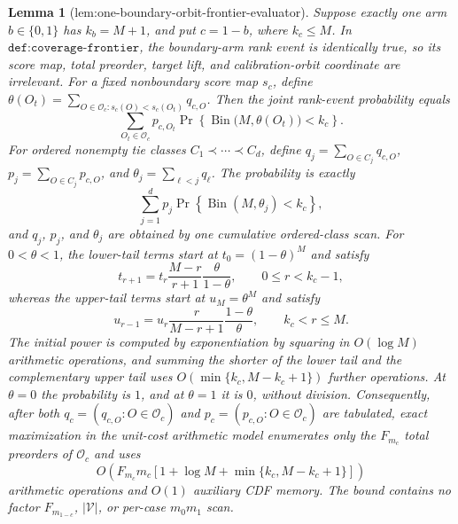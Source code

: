 \documentclass{article}
\newtheorem{lemma}{Lemma}
\begin{document}
\begin{lemma}[lem:one-boundary-orbit-frontier-evaluator]\label{lem:one-boundary-orbit-frontier-evaluator}
Suppose exactly one arm \(b\in\{0,1\}\) has \(k_b=M+1\), and put \(c=1-b\), where \(k_c\le M\). In \(\texttt{def:coverage-frontier}\), the boundary-arm rank event is identically true, so its score map, total preorder, target lift, and calibration-orbit coordinate are irrelevant. For a fixed nonboundary score map \(s_c\), define \(\theta(O_t)=\sum_{O\in\mathcal O_c:s_c(O)<s_c(O_t)}q_{c,O}\). Then the joint rank-event probability equals
\[
\sum_{O_t\in\mathcal O_c}p_{c,O_t}\Pr\!\left\{\operatorname{Bin}\bigl(M,\theta(O_t)\bigr)<k_c\right\}.
\]
For ordered nonempty tie classes \(C_1\prec\cdots\prec C_d\), define \(q_j=\sum_{O\in C_j}q_{c,O}\), \(p_j=\sum_{O\in C_j}p_{c,O}\), and \(\theta_j=\sum_{\ell<j}q_\ell\). The probability is exactly
\[
\sum_{j=1}^d p_j\Pr\!\left\{\operatorname{Bin}(M,\theta_j)<k_c\right\},
\]
and \(q_j\), \(p_j\), and \(\theta_j\) are obtained by one cumulative ordered-class scan. For \(0<\theta<1\), the lower-tail terms start at \(t_0=(1-\theta)^M\) and satisfy
\[
t_{r+1}=t_r\frac{M-r}{r+1}\frac{\theta}{1-\theta},\qquad 0\le r<k_c-1,
\]
whereas the upper-tail terms start at \(u_M=\theta^M\) and satisfy
\[
u_{r-1}=u_r\frac{r}{M-r+1}\frac{1-\theta}{\theta},\qquad k_c<r\le M.
\]
The initial power is computed by exponentiation by squaring in \(O(\log M)\) arithmetic operations, and summing the shorter of the lower tail and the complementary upper tail uses \(O(\min\{k_c,M-k_c+1\})\) further operations. At \(\theta=0\) the probability is \(1\), and at \(\theta=1\) it is \(0\), without division. Consequently, after both \(q_c=(q_{c,O}:O\in\mathcal O_c)\) and \(p_c=(p_{c,O}:O\in\mathcal O_c)\) are tabulated, exact maximization in the unit-cost arithmetic model enumerates only the \(F_{m_c}\) total preorders of \(\mathcal O_c\) and uses
\[
O\!\left(F_{m_c}m_c\left[1+\log M+\min\{k_c,M-k_c+1\}\right]\right)
\]
arithmetic operations and \(O(1)\) auxiliary CDF memory. The bound contains no factor \(F_{m_{1-c}}\), \(|\mathcal V|\), or per-case \(m_0m_1\) scan.
\end{lemma}
\end{document}

